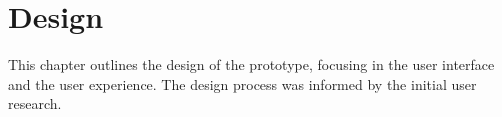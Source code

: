 %
\chapter{Design}
\label{sec:design}

This chapter outlines the design of the prototype, focusing in the user interface and the user experience. The design process was informed by the initial user research.